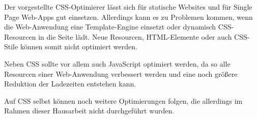 Der vorgestellte CSS-Optimierer lässt sich für statische Websites und für Single Page Web-Apps gut einsetzen. Allerdings kann es zu Problemen kommen, wenn die Web-Anwendung eine Template-Engine einsetzt oder dynamisch CSS-Resourcen in die Seite lädt. Neue Resourcen, HTML-Elemente oder auch CSS-Stile können somit nicht optimiert werden. 

Neben CSS sollte vor allem auch JavaScript optimiert werden, da so alle Resourcen einer Web-Anwendung verbessert werden und eine noch größere Reduktion der Ladezeiten entstehen kann. 

Auf CSS selbst können noch weitere Optimierungen folgen, die allerdings im Rahmen dieser Hausarbeit nicht durchgeführt wurden.  